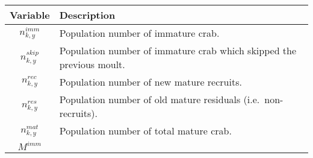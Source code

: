 \documentclass[
]{article}
\begin{document}
\begin{longtable}[]{@{}cl@{}}
\toprule
\begin{minipage}[b]{0.20\columnwidth}\centering
Variable\strut
\end{minipage} & \begin{minipage}[b]{0.74\columnwidth}\raggedright
Description\strut
\end{minipage}\tabularnewline
\midrule
\endhead
\begin{minipage}[t]{0.20\columnwidth}\centering
\(n_{k,y}^{imm}\)\strut
\end{minipage} & \begin{minipage}[t]{0.74\columnwidth}\raggedright
Population number of immature crab.\strut
\end{minipage}\tabularnewline
\begin{minipage}[t]{0.20\columnwidth}\centering
\(n_{k,y}^{skip}\)\strut
\end{minipage} & \begin{minipage}[t]{0.74\columnwidth}\raggedright
Population number of immature crab which skipped the previous
moult.\strut
\end{minipage}\tabularnewline
\begin{minipage}[t]{0.20\columnwidth}\centering
\(n_{k,y}^{rec}\)\strut
\end{minipage} & \begin{minipage}[t]{0.74\columnwidth}\raggedright
Population number of new mature recruits.\strut
\end{minipage}\tabularnewline
\begin{minipage}[t]{0.20\columnwidth}\centering
\(n_{k,y}^{res}\)\strut
\end{minipage} & \begin{minipage}[t]{0.74\columnwidth}\raggedright
Population number of old mature residuals (i.e.~non-recruits).\strut
\end{minipage}\tabularnewline
\begin{minipage}[t]{0.20\columnwidth}\centering
\(n_{k,y}^{mat}\)\strut
\end{minipage} & \begin{minipage}[t]{0.74\columnwidth}\raggedright
Population number of total mature crab.\strut
\end{minipage}\tabularnewline
\begin{minipage}[t]{0.20\columnwidth}\centering
\(M^{imm}\)\strut
\end{minipage} & \begin{minipage}[t]{0.74\columnwidth}\raggedright

\end{minipage}
\end{longtable}
\end{document}

